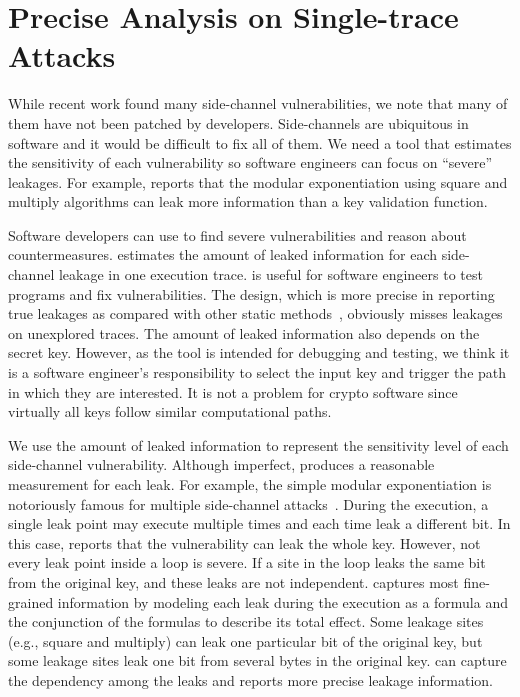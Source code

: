 \section{Precise Analysis on Single-trace Attacks}
While recent work found many side-channel vulnerabilities,
we note that many of them have not been patched by developers.
Side-channels are ubiquitous in software and it would be difficult to fix all of them.
We need a tool that estimates the sensitivity of each vulnerability
so software engineers can focus on
``severe'' leakages. For example, \tool{} reports that
the modular exponentiation using square and multiply algorithms can
leak more information than a key validation function.

Software developers can use \tool{} to find severe vulnerabilities
and reason about countermeasures.
\tool{} estimates the amount of leaked information for each side-channel leakage
in one execution trace. \tool{} is useful for software
engineers to test programs and fix vulnerabilities.
The design, which is more precise in reporting true leakages as compared with other static
methods~\cite{197207,BacelarAlmeida:2013:FVS:2483313.2483334}, obviously misses
leakages on unexplored traces. The amount of leaked information also depends on the secret key.
However, as the tool is intended for debugging and testing,
we think it is a software engineer's responsibility to select the input key and trigger
the path in which they are interested. It is not a problem for crypto software
since virtually all keys follow similar computational paths.

We use the amount of leaked information to represent the sensitivity level of
each side-channel vulnerability. Although imperfect, \tool{} produces a reasonable
measurement for each leak. For example, the simple modular exponentiation is
notoriously famous for multiple side-channel attacks~\cite{kocher1996timing}.
During the execution, a single leak point may execute multiple times
and each time leak a different bit. In this case, \tool{} reports that the
vulnerability can leak the whole key. However, not every leak point inside a
loop is severe. If a site in the loop leaks the same bit from the
original key, and these leaks are not independent. \tool{} captures most
fine-grained information by modeling each leak during the execution as a
formula and the conjunction of the formulas to describe its total effect.
Some leakage sites (e.g., square and multiply)
can leak one particular bit of the original key, but some leakage sites leak one bit
from several bytes in the original key. \tool{} can capture the dependency among the leaks and
reports more precise leakage information.

